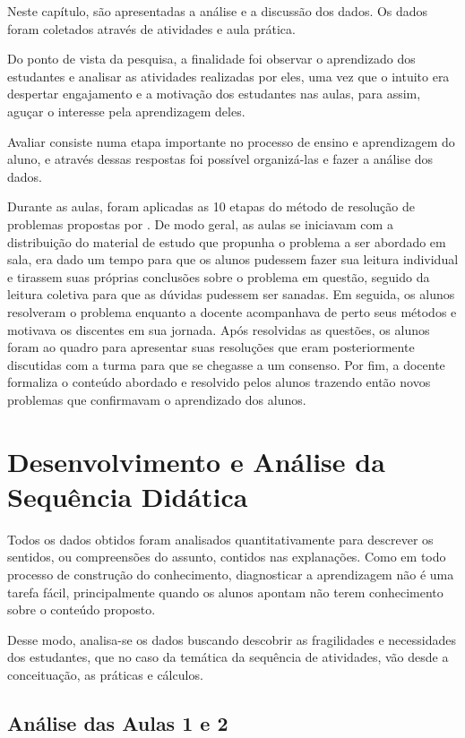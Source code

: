 Neste capítulo, são apresentadas a análise e a discussão dos dados. Os dados foram coletados através de atividades e aula prática.

Do ponto de vista da pesquisa, a finalidade foi observar o aprendizado dos estudantes e analisar as atividades realizadas por eles, uma vez que o intuito era despertar engajamento e a motivação dos estudantes nas aulas, para assim, aguçar o interesse pela aprendizagem deles.

Avaliar consiste numa etapa importante no processo de ensino e aprendizagem do aluno, e através dessas respostas foi possível organizá-las e fazer a análise dos dados.

Durante as aulas, foram aplicadas as 10 etapas do método de resolução de problemas propostas por . De modo geral, as aulas se iniciavam com a distribuição do material de estudo que propunha o problema a ser abordado em sala, era dado um tempo para que os alunos pudessem fazer sua leitura individual e tirassem suas próprias conclusões sobre o problema em questão, seguido da leitura coletiva para que as dúvidas pudessem ser sanadas. Em seguida, os alunos resolveram o problema enquanto a docente acompanhava de perto seus métodos e motivava os discentes em sua jornada. Após resolvidas as questões, os alunos foram ao quadro para apresentar suas resoluções que eram posteriormente discutidas com a turma para que se chegasse a um consenso. Por fim, a docente formaliza o conteúdo abordado e resolvido pelos alunos trazendo então novos problemas que confirmavam o aprendizado dos alunos.

\section{Desenvolvimento e Análise da Sequência Didática}

Todos os dados obtidos foram analisados quantitativamente para descrever os sentidos, ou compreensões do assunto, contidos nas explanações. Como em todo processo de construção do conhecimento, diagnosticar a aprendizagem não é uma tarefa fácil, principalmente quando os alunos apontam não terem conhecimento sobre o conteúdo proposto.

Desse modo, analisa-se os dados buscando descobrir as fragilidades e necessidades dos estudantes, que no caso da temática da sequência de atividades, vão desde a conceituação, as práticas e cálculos.

\subsection{Análise das Aulas 1 e 2}

